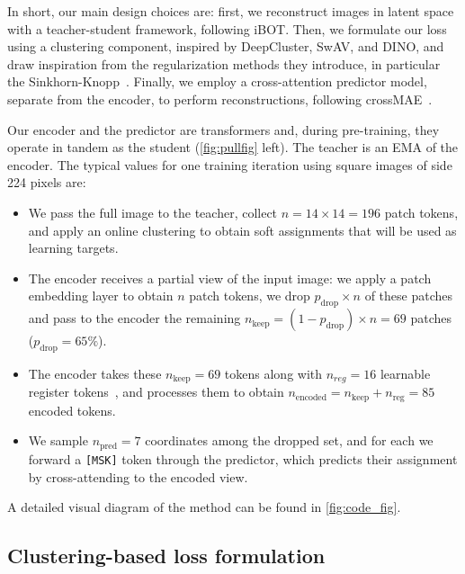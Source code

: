 In short, our main design choices are: first, we reconstruct images in latent space with a teacher-student framework, following iBOT.
Then, we formulate our loss using a clustering component, inspired by DeepCluster, SwAV, and DINO, and draw inspiration from the regularization methods they introduce, in particular the Sinkhorn-Knopp~\citep{sinkhorn1967concerning}. 
Finally, we employ a cross-attention predictor model, separate from the encoder, to perform reconstructions, following crossMAE~\citep{crossmae}.

Our encoder and the predictor are transformers \citep{dosovitskiy2020image} and, during pre-training, they operate in tandem as the student (\cref{fig:pullfig} left). The teacher is an EMA of the encoder.
The typical values for one training iteration using square images of side 224 pixels are:
\begin{itemize}
    \itemsep0em 
    \item We pass the full image to the teacher, collect $n = 14\times{}14 = 196$ patch tokens, and apply an online clustering to obtain soft assignments that will be used as learning targets.
    \item The encoder receives a partial view of the input image: we apply a patch embedding layer to obtain $n$ patch tokens, we drop $p_\text{drop}{\times}n$ of these patches and pass to the encoder the remaining $n_\text{keep}=(1-p_\text{drop}){\times}n=69$ patches ($p_\text{drop}=65\%$).
    \item The encoder takes these $n_\text{keep}=69$ tokens along with $n_{reg}=16$ learnable register tokens~\citep{vitneedreg}, and processes them to obtain $n_\text{encoded}=n_\text{keep} + n_\text{reg} = 85$ encoded tokens.
    \item We sample $n_\text{pred}=7$ coordinates among the dropped set, and for each we forward a \texttt{[MSK]} token through the predictor, which predicts their assignment by cross-attending to the encoded view.
\end{itemize}
A detailed visual diagram of the method can be found in \cref{fig:code_fig}.



\subsection{Clustering-based loss formulation}
\label{sec:loss}


